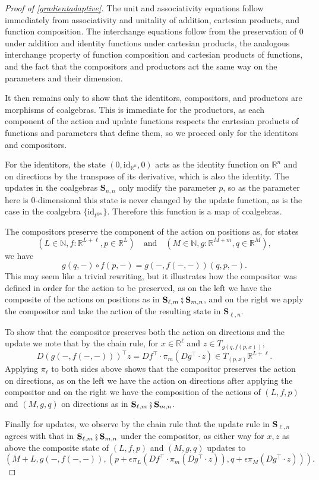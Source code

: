 \documentclass[11pt, one side, article]{memoir}
\theoremstyle{definition}
\theoremstyle{plain}
\newcommand{\Cat}[1]{\mathbf{#1}}%
\newcommand{\id}{\mathrm{id}}
\newcommand{\then}{\mathbin{\fatsemi}}
\newcommand{\nn}{\mathbb{N}}
\newcommand{\rr}{\mathbb{R}}
\newcommand{\0}{\textsf{0}}
\newcommand{\1}{\tn{\textsf{1}}}
\renewcommand{\S}{{\Cat{S}}}
\newcommand{\idcoalg}[1]{{\{\id_{#1}\}}}
\begin{document}
\begin{proof}[Proof of \cref{gradientadaptive}]
The unit and associativity equations follow immediately from associativity and unitality of addition, cartesian products, and function composition. The interchange equations follow from the preservation of 0 under addition and identity functions under cartesian products, the analogous interchange property of function composition and cartesian products of functions, and the fact that the compositors and productors act the same way on the parameters and their dimension. 

It then remains only to show that the identitors, compositors, and productors are morphisms of coalgebras. This is immediate for the productors, as each component of the action and update functions respects the cartesian products of functions and parameters that define them, so we proceed only for the identitors and compositors.

For the identitors, the state $(0,\id_{\rr^n},0)$ acts as the identity function on $\rr^n$ and on directions by the transpose of its derivative, which is also the identity. The updates in the coalgebras $\S_{n,n}$ only modify the parameter $p$, so as the parameter here is 0-dimensional this state is never changed by the update function, as is the case in the coalgebra $\idcoalg{t^{\otimes n}}$. Therefore this function is a map of coalgebras.

The compositors preserve the component of the action on positions as, for states 
\[(L \in \nn, f\colon \rr^{L+\ell}, p \in \rr^L) \quad \textrm{and} \quad (M \in \nn, g\colon \rr^{M+m}, q \in \rr^M),\]
we have 
\[g(q,-) \circ f(p,-) = g(-,f(-,-))(q,p,-).\]
This may seem like a trivial rewriting, but it illustrates how the compositor was defined in order for the action to be preserved, as on the left we have the composite of the actions on positions as in $\S_{\ell,m}\then\S_{m,n}$, and on the right we apply the compositor and take the action of the resulting state in $\S_{\ell,n}$.

To show that the compositor preserves both the action on directions and the update we note that by the chain rule, for $x \in \rr^\ell$ and $z \in T_{g(q,f(p,x))}$,
\[D\left( g(-,f(-,-)) \right)^\top z = Df^\top \cdot \pi_m(Dg^\top \cdot z) \in T_{(p,x)}\rr^{L+\ell}.\]
Applying $\pi_\ell$ to both sides above shows that the compositor preserves the action on directions, as on the left we have the action on directions after applying the compositor and on the right we have the composition of the actions of $(L,f,p)$ and $(M,g,q)$ on directions as in $\S_{\ell,m}\then\S_{m,n}$.

Finally for updates, we observe by the chain rule that the update rule in $\S_{\ell,n}$ agrees with that in $\S_{\ell,m}\then\S_{m,n}$ under the compositor, as either way for $x,z$ as above the composite state of $(L,f,p)$ and $(M,g,q)$ updates to 
\[\left( M+L,g(-,f(-,-)),\left( p + \epsilon \pi_L (Df^\top \cdot \pi_m(Dg^\top \cdot z)),q + \epsilon \pi_M(Dg^\top \cdot z) \right) \right).\]
\end{proof}




\printbibliography 
\end{document}
